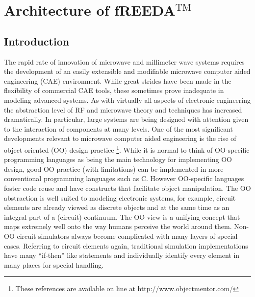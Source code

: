 
\chapter{Architecture of fREEDA$^{\mathrm{TM}}$} \label{ch_arch}

\section{Introduction}

The rapid rate of innovation of microwave and millimeter wave systems
requires the development of an easily extensible and modifiable
microwave computer aided engineering (CAE) environment. While great
strides have been made in the flexibility of commercial CAE tools,
these sometimes prove inadequate in modeling advanced systems.  As
with virtually all aspects of electronic engineering the abstraction
level of RF and microwave theory and techniques has increased
dramatically.  In particular, large systems are being designed with
attention given to the interaction of components at many levels.  One
of the most significant developments relevant to microwave computer
aided engineering is the rise of object oriented (OO) design practice
\cite{eliens,dep_inv,open,liskov,int_seg,uml_tut}\footnote{These
references are available on line at http://www.objectmentor.com/}.
While it is normal to think of OO-specific programming languages as
being the main technology for implementing OO design, good OO practice
(with limitations) can be implemented in more conventional programming
languages such as C.  However OO-specific languages foster code reuse
and have constructs that facilitate object manipulation.  The OO
abstraction is well suited to modeling electronic systems, for
example, circuit elements are already viewed as discrete objects and
at the same time as an integral part of a (circuit) continuum. The OO
view is a unifying concept that maps extremely well onto the way
humans perceive the world around them.  Non-OO circuit simulators
always become complicated with many layers of special cases.
Referring to circuit elements again, traditional simulation
implementations have many ``if-then'' like statements and individually
identify every element in many places for special handling.

